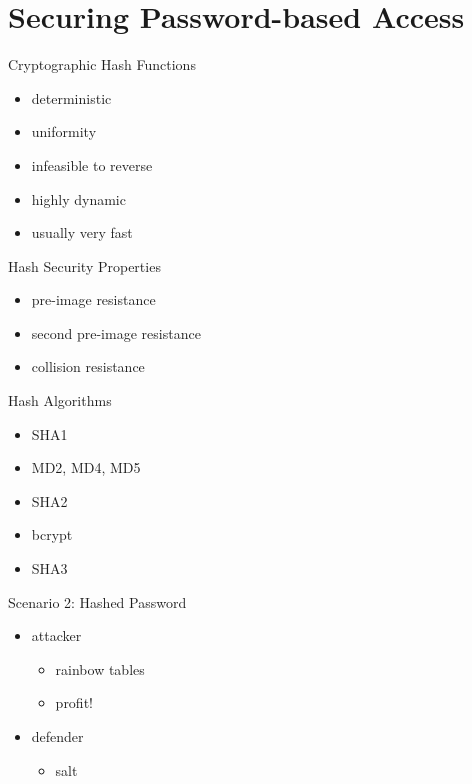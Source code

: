 \documentclass{curs}
\begin{document}
\section{Securing Password-based Access}

\begin{frame}{Cryptographic Hash Functions}
  \begin{itemize}
    \item deterministic
    \item uniformity
    \item infeasible to reverse
    \item highly dynamic
    \item usually very fast
  \end{itemize}
\end{frame}

\begin{frame}{Hash Security Properties}
  \begin{itemize}
    \item pre-image resistance
    \item second pre-image resistance
    \item collision resistance
  \end{itemize}
\end{frame}

\begin{frame}{Hash Algorithms}
  \begin{itemize}
    \item \color{red}SHA1
    \item \color{red}MD2, MD4, MD5
    \item \color{lime}SHA2
    \item \color{green}bcrypt
    \item \color{green}SHA3
  \end{itemize}
\end{frame}

\begin{frame}{Scenario 2: Hashed Password}
  \begin{itemize}
    \item attacker
      \begin{itemize}
        \item rainbow tables
        \item profit!
      \end{itemize}
    \item defender
      \begin{itemize}
        \item salt
      \end{itemize}
  \end{itemize}
\end{frame}
\end{document}
